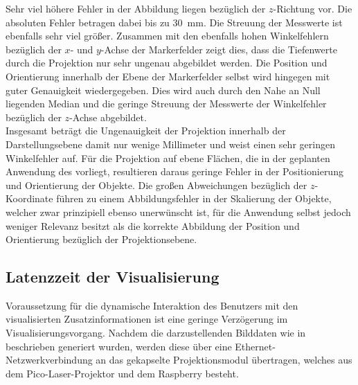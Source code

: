 Sehr viel höhere Fehler in der Abbildung liegen bezüglich der $z$-Richtung vor. Die absoluten Fehler betragen dabei bis zu \SI{30}{\milli\meter}. Die Streuung der Messwerte ist ebenfalls sehr viel größer. Zusammen mit den ebenfalls hohen Winkelfehlern bezüglich der $x$- und $y$-Achse der Markerfelder zeigt dies, dass die Tiefenwerte durch die Projektion nur sehr ungenau abgebildet werden. Die Position und Orientierung innerhalb der Ebene der Markerfelder selbst wird hingegen mit guter Genauigkeit wiedergegeben. Dies wird auch durch den Nahe an Null liegenden Median und die geringe Streuung der Messwerte der Winkelfehler bezüglich der $z$-Achse abgebildet.\\

Insgesamt beträgt die Ungenauigkeit der Projektion innerhalb der Darstellungsebene damit nur wenige Millimeter und weist einen sehr geringen Winkelfehler auf. Für die Projektion auf ebene Flächen, die in der geplanten Anwendung des  vorliegt, resultieren daraus geringe Fehler in der Positionierung und Orientierung der Objekte. Die großen Abweichungen bezüglich der $z$-Koordinate führen zu einem Abbildungsfehler in der Skalierung der Objekte, welcher zwar prinzipiell ebenso unerwünscht ist, für die Anwendung selbst jedoch weniger Relevanz besitzt als die korrekte Abbildung der Position und Orientierung bezüglich der Projektionsebene.

\prever{
}


%

\subsection{Latenzzeit der Visualisierung}
Voraussetzung für die dynamische Interaktion des Benutzers mit den visualisierten Zusatzinformationen ist eine geringe Verzögerung im Visualisierungsvorgang. Nachdem die darzustellenden Bilddaten wie in  beschrieben generiert wurden, werden diese über eine Ethernet-Netzwerkverbindung an das gekapselte Projektionsmodul übertragen, welches aus dem Pico-Laser-Projektor und dem Raspberry besteht.\\

